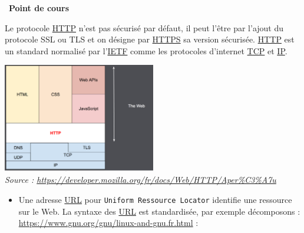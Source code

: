 \documentclass[
  11pt,
]{article}
\newcommand{\passthrough}[1]{#1}
\providecommand{\tightlist}{%
  \setlength{\itemsep}{0pt}\setlength{\parskip}{0pt}}
\newcounter{cours}
\newenvironment{cours}[1]
{\par \medskip   \addtocounter{cours}{1} \noindent  
\begin{bclogo}[arrondi =0.1,  ombre = true, barre=none, logo=\bcbook, marge=4]{~\textbf{Point de cours} \textbf{\thecours} {\itshape #1} }  \par}
{
\end{bclogo}
 \par \bigskip }
\begin{document}
\begin{cours}{}
Le protocole
\href{https://developer.mozilla.org/fr/docs/Glossaire/HTTP}{HTTP} n'est
pas sécurisé par défaut, il peut l'être par l'ajout du protocole SSL ou
TLS et on désigne par
\href{https://developer.mozilla.org/fr/docs/Glossaire/https}{HTTPS} sa
version sécurisée.
\href{https://developer.mozilla.org/fr/docs/Glossaire/HTTP}{HTTP} est un
standard normalisé par
l'\href{https://developer.mozilla.org/fr/docs/Glossaire/IETF}{IETF}
comme les protocoles d'internet
\href{https://developer.mozilla.org/fr/docs/Glossaire/TCP}{TCP} et
\href{https://developer.mozilla.org/fr/docs/Glossaire/IP_Address}{IP}.

\includegraphics[width=0.5\textwidth,height=\textheight]{images/HTTP_layers.png}\\
\emph{Source :
\url{https://developer.mozilla.org/fr/docs/Web/HTTP/Aper\%C3\%A7u}}

\begin{itemize}
\tightlist
\item
  Une adresse
  \href{https://developer.mozilla.org/fr/docs/Glossaire/URL}{URL} pour
  \passthrough{\lstinline!Uniform Ressource Locator!} identifie une
  ressource sur le Web. La syntaxe des
  \href{https://developer.mozilla.org/fr/docs/Glossaire/URL}{URL} est
  standardisée, par exemple décomposons :\\
  \url{https://www.gnu.org/gnu/linux-and-gnu.fr.html} :


\end{itemize}
\end{cours}
\end{document}
